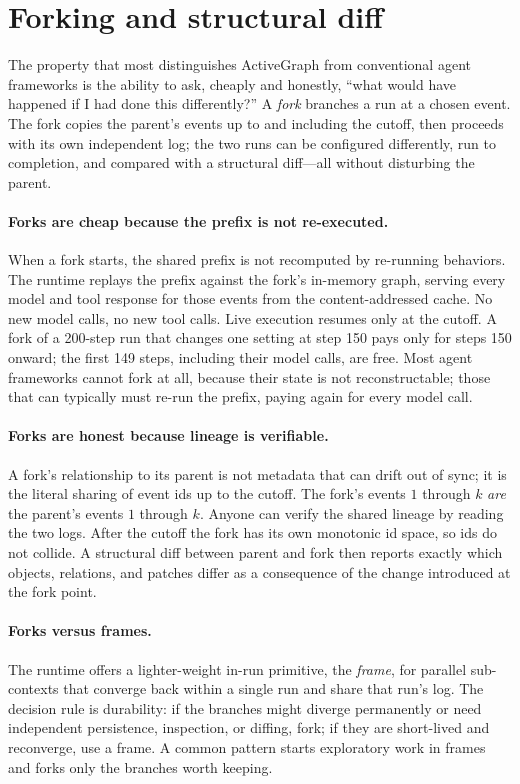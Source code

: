 \documentclass[11pt]{article}
\begin{document}
\section{Forking and structural diff}
\label{sec:forking}

The property that most distinguishes ActiveGraph from conventional agent
frameworks is the ability to ask, cheaply and honestly, ``what would have happened
if I had done this differently?'' A \emph{fork} branches a run at a chosen event.
The fork copies the parent's events up to and including the cutoff, then proceeds
with its own independent log; the two runs can be configured differently, run to
completion, and compared with a structural diff---all without disturbing the
parent.

\paragraph{Forks are cheap because the prefix is not re-executed.}
When a fork starts, the shared prefix is not recomputed by re-running behaviors.
The runtime replays the prefix against the fork's in-memory graph, serving every
model and tool response for those events from the content-addressed cache. No new
model calls, no new tool calls. Live execution resumes only at the cutoff. A fork
of a 200-step run that changes one setting at step 150 pays only for steps 150
onward; the first 149 steps, including their model calls, are free. Most agent
frameworks cannot fork at all, because their state is not reconstructable; those
that can typically must re-run the prefix, paying again for every model call.

\paragraph{Forks are honest because lineage is verifiable.}
A fork's relationship to its parent is not metadata that can drift out of sync; it
is the literal sharing of event ids up to the cutoff. The fork's events $1$ through
$k$ \emph{are} the parent's events $1$ through $k$. Anyone can verify the shared
lineage by reading the two logs. After the cutoff the fork has its own monotonic id
space, so ids do not collide. A structural diff between parent and fork then
reports exactly which objects, relations, and patches differ as a consequence of
the change introduced at the fork point.

\paragraph{Forks versus frames.}
The runtime offers a lighter-weight in-run primitive, the \emph{frame}, for
parallel sub-contexts that converge back within a single run and share that run's
log. The decision rule is durability: if the branches might diverge permanently or
need independent persistence, inspection, or diffing, fork; if they are
short-lived and reconverge, use a frame. A common pattern starts exploratory work
in frames and forks only the branches worth keeping.
\end{document}
